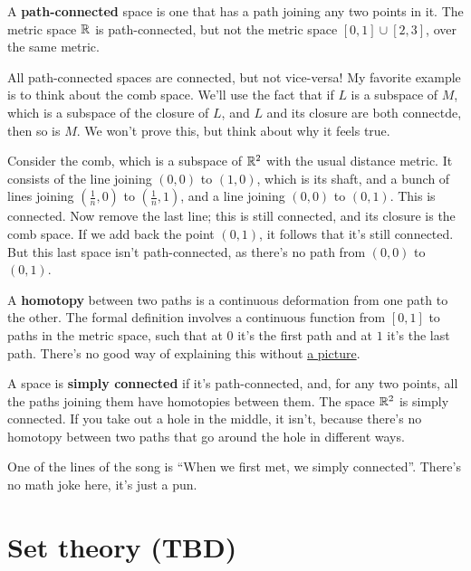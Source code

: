 \documentclass[11pt,paper=letter]{scrartcl}
\renewcommand{\bluebf}[1]{{\bfseries \color{Blue} #1}}
\begin{document}
A \textbf{ path-connected } space is one that has a path joining any two points in it. The metric space $\mathbb R$ is path-connected, but not the metric space $[ 0, 1 ] \cup [ 2, 3 ]$, over the same metric.

\begin{remboxed}
  All path-connected spaces are connected, but not vice-versa! My favorite example is to think about the comb space. We'll use the fact that if $L$ is a subspace of $M$, which is a subspace of the closure of $L$, and $L$ and its closure are both connectde, then so is $M$. We won't prove this, but think about why it feels true.

  Consider the comb, which is a subspace of $\mathbb R^2$ with the usual distance metric. It consists of the line joining $(0, 0)$ to $(1, 0)$, which is its shaft, and a bunch of lines joining $ \left( \frac{1}{n} , 0 \right) $ to $ \left( \frac{1}{n} , 1 \right) $, and a line joining $ \left( 0, 0 \right) $ to $ \left( 0, 1 \right) $. This is connected. Now remove the last line; this is still connected, and its closure is the comb space. If we add back the point $(0, 1)$, it follows that it's still connected. But this last space isn't path-connected, as there's no path from $(0, 0)$ to $(0, 1)$.
\end{remboxed}

A \textbf{homotopy} between two paths is a continuous deformation from one path to the other. The formal definition involves a continuous function from $[0, 1]$ to paths in the metric space, such that at $0$ it's the first path and at $1$ it's the last path. There's no good way of explaining this without \href{https://commons.wikimedia.org/wiki/File:HomotopySmall.gif}{a picture}.

A space is \bluebf{simply connected} if it's path-connected, and, for any two points, all the paths joining them have homotopies between them. The space $\mathbb R^2$ is simply connected. If you take out a hole in the middle, it isn't, because there's no homotopy between two paths that go around the hole in different ways.

\begin{remboxed}
  One of the lines of the song is ``When we first met, we simply connected''. There's no math joke here, it's just a pun.
\end{remboxed}

\section{Set theory (TBD)}
\end{document}
